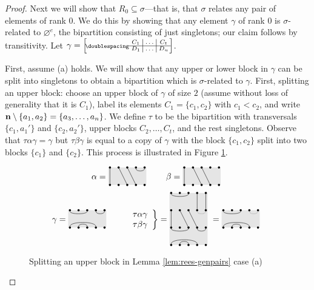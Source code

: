 \begin{lemma}
\begin{proof}
    Next we will show that $R_0 \subseteq \sigma$---that is, that $\sigma$
    relates any pair of elements of rank $0$.  We do this by showing that any
    element $\gamma$ of rank $0$ is $\sigma$-related to $\varnothing^e$, the
    bipartition consisting of just singletons; our claim follows by
    transitivity.  Let
    $\gamma = \bipart{c|c|c}{1-3}{C_1 & \ldots & C_t}{D_1 & \ldots & D_u}$.

    First, assume (a) holds.  We will show that any upper or lower block in
    $\gamma$ can be split into singletons to obtain a bipartition which is
    $\sigma$-related to $\gamma$.  First, splitting an upper block: choose an
    upper block of $\gamma$ of size $2$ (assume without loss of generality that
    it is $C_1$), label its elements $C_1 = \{c_1, c_2\}$ with $c_1 < c_2$, and
    write $\mathbf{n} \setminus \{a_1, a_2\} = \{a_3, \ldots, a_n\}$.  We define
    $\tau$ to be the bipartition with transversals $\{c_1, a_1'\}$ and
    $\{c_2, a_2'\}$, upper blocks $C_2, \ldots, C_t$, and the rest singletons.
    Observe that $\tau\alpha\gamma = \gamma$ but $\tau\beta\gamma$ is equal
    to a copy of $\gamma$ with the block $\{c_1, c_2\}$ split into two blocks
    $\{c_1\}$ and $\{c_2\}$.  This process is illustrated in Figure
    \ref{fig:case-a-r0-example-upper}.

    \begin{figure}[h]
      \centering
      $$
      \alpha = \bipartdiag{\tv11 \tv23 \tv34 \tc45} \qquad
      \beta = \bipartdiag{\tv11 \tv23 \tv34}
      $$
      $$
      \gamma = \bipartdiag{\tc13 \tc45 \bC14 \bc23} \qquad
      \left.
        \begin{array}{l}\tau\alpha\gamma\\ \tau\beta\gamma \end{array}
      \right\} = \triplebipartdiag{
        \uutc13 \uutv44 \uutv55
        \utv11 \utv23 \utv34
        \draw[densely dotted](5, 3.875) .. controls (5, 3.5) and (4, 3.5) .. (4, 3.875);
        \tc13 \tc45 \bC14 \bc23
      } = \bipartdiag{\tc13 \bC14 \bc23
        \draw[densely dotted](4, 1.875) .. controls (4, 1.5) and (5, 1.5) .. (5, 1.875);
      }
      $$
      \caption{Splitting an upper block in Lemma \ref{lem:rees-genpairs} case
        (a)}
      \label{fig:case-a-r0-example-upper}
    \end{figure}


\end{proof}
\end{lemma}
